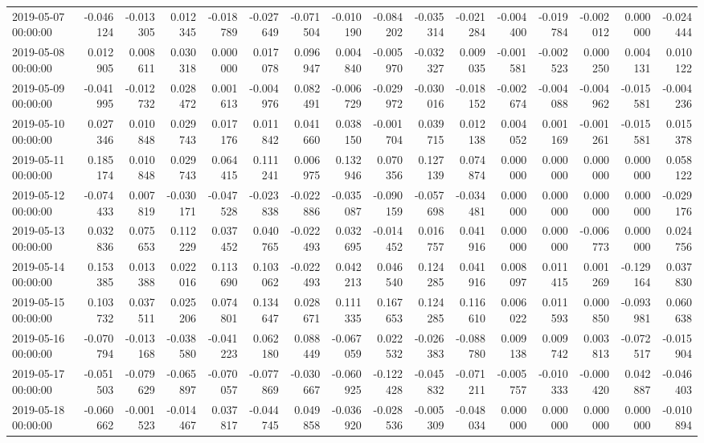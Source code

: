 \begin{tabular}{lrrrrrrrrrrrrrrr}
2019-05-07 00:00:00 & -0.046124 & -0.013305 & 0.012345 & -0.018789 & -0.027649 & -0.071504 & -0.010190 & -0.084202 & -0.035314 & -0.021284 & -0.004400 & -0.019784 & -0.002012 & 0.000000 & -0.024444 \\
2019-05-08 00:00:00 & 0.012905 & 0.008611 & 0.030318 & 0.000000 & 0.017078 & 0.096947 & 0.004840 & -0.005970 & -0.032327 & 0.009035 & -0.001581 & -0.002523 & 0.000250 & 0.004131 & 0.010122 \\
2019-05-09 00:00:00 & -0.041995 & -0.012732 & 0.028472 & 0.001613 & -0.004976 & 0.082491 & -0.006729 & -0.029972 & -0.030016 & -0.018152 & -0.002674 & -0.004088 & -0.004962 & -0.015581 & -0.004236 \\
2019-05-10 00:00:00 & 0.027346 & 0.010848 & 0.029743 & 0.017176 & 0.011842 & 0.041660 & 0.038150 & -0.001704 & 0.039715 & 0.012138 & 0.004052 & 0.001169 & -0.001261 & -0.015581 & 0.015378 \\
2019-05-11 00:00:00 & 0.185174 & 0.010848 & 0.029743 & 0.064415 & 0.111241 & 0.006975 & 0.132946 & 0.070356 & 0.127139 & 0.074874 & 0.000000 & 0.000000 & 0.000000 & 0.000000 & 0.058122 \\
2019-05-12 00:00:00 & -0.074433 & 0.007819 & -0.030171 & -0.047528 & -0.023838 & -0.022886 & -0.035087 & -0.090159 & -0.057698 & -0.034481 & 0.000000 & 0.000000 & 0.000000 & 0.000000 & -0.029176 \\
2019-05-13 00:00:00 & 0.032836 & 0.075653 & 0.112229 & 0.037452 & 0.040765 & -0.022493 & 0.032695 & -0.014452 & 0.016757 & 0.041916 & 0.000000 & 0.000000 & -0.006773 & 0.000000 & 0.024756 \\
2019-05-14 00:00:00 & 0.153385 & 0.013388 & 0.022016 & 0.113690 & 0.103062 & -0.022493 & 0.042213 & 0.046540 & 0.124285 & 0.041916 & 0.008097 & 0.011415 & 0.001269 & -0.129164 & 0.037830 \\
2019-05-15 00:00:00 & 0.103732 & 0.037511 & 0.025206 & 0.074801 & 0.134647 & 0.028671 & 0.111335 & 0.167653 & 0.124285 & 0.116610 & 0.006022 & 0.011593 & 0.000850 & -0.093981 & 0.060638 \\
2019-05-16 00:00:00 & -0.070794 & -0.013168 & -0.038580 & -0.041223 & 0.062180 & 0.088449 & -0.067059 & 0.022532 & -0.026383 & -0.088780 & 0.009138 & 0.009742 & 0.003813 & -0.072517 & -0.015904 \\
2019-05-17 00:00:00 & -0.051503 & -0.079629 & -0.065897 & -0.070057 & -0.077869 & -0.030667 & -0.060925 & -0.122428 & -0.045832 & -0.071211 & -0.005757 & -0.010333 & -0.000420 & 0.042887 & -0.046403 \\
2019-05-18 00:00:00 & -0.060662 & -0.001523 & -0.014467 & 0.037817 & -0.044745 & 0.049858 & -0.036920 & -0.028536 & -0.005309 & -0.048034 & 0.000000 & 0.000000 & 0.000000 & 0.000000 & -0.010894 \\

\end{tabular}
